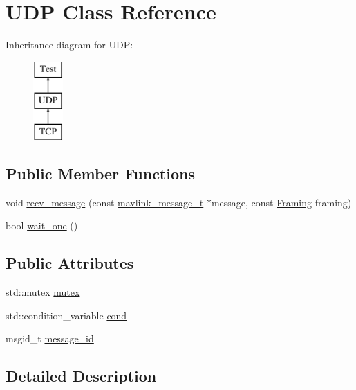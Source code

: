 \hypertarget{classUDP}{}\section{U\+DP Class Reference}
\label{classUDP}
Inheritance diagram for U\+DP\+:\begin{figure}[H]
\begin{center}
\leavevmode
\includegraphics[height=3.000000cm]{classUDP}
\end{center}
\end{figure}
\subsection*{Public Member Functions}
\begin{DoxyCompactItemize}
\item 
void \mbox{\hyperlink{classUDP_abb13c71155609dc75f7157d4f23b8dcf}{recv\+\_\+message}} (const \mbox{\hyperlink{include__v0_89_2mavlink__types_8h_a63b963764c09dc72f4910c1521e325b9}{mavlink\+\_\+message\+\_\+t}} $\ast$message, const \mbox{\hyperlink{group__mavconn_gac93e6f8262bcc6008b4882ae6213f494}{Framing}} framing)
\item 
bool \mbox{\hyperlink{classUDP_a350638d58a516efbe6dd3c8dac543e0d}{wait\+\_\+one}} ()
\end{DoxyCompactItemize}
\subsection*{Public Attributes}
\begin{DoxyCompactItemize}
\item 
std\+::mutex \mbox{\hyperlink{classUDP_a6e56ea42dfab1be814356dfea9b4c410}{mutex}}
\item 
std\+::condition\+\_\+variable \mbox{\hyperlink{classUDP_a0e359be3d5794345f991db733f8b7cac}{cond}}
\item 
msgid\+\_\+t \mbox{\hyperlink{classUDP_abfbcb22c717445e6faf45a4294a785b4}{message\+\_\+id}}
\end{DoxyCompactItemize}


\subsection{Detailed Description}


